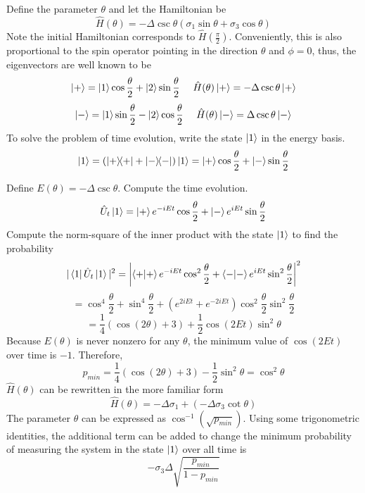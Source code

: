 \begin{sol}
Define the parameter $\theta$ and let the Hamiltonian be 
$$\hat H(\theta)=-\Delta\csc\theta(\sigma_1\sin\theta+\sigma_3\cos\theta)$$
Note the initial Hamiltonian corresponds to $\hat H(\frac{\pi}{2})$. Conveniently, this is also proportional to the spin operator pointing in the direction $\theta$ and $\phi=0$, thus, the eigenvectors are well known to be
$$\ket+= \ket1\cos\frac{\theta}{2}+\ket2\sin\frac{\theta}{2}\:\:\:\:\:\:\hat H(\theta)\ket+=-\Delta\csc\theta\ket+$$ $$\ket-= \ket1\sin\frac{\theta}{2}-\ket2\cos\frac{\theta}{2}\:\:\:\:\:\:\hat H(\theta)\ket-=\Delta\csc\theta\ket-$$ 
To solve the problem of time evolution, write the state $\ket1$ in the energy basis.
$$\ket1=(\ketbra{+}{+}+\ketbra{-}{-})\ket1=\ket+\cos\frac{\theta}{2}+\ket-\sin\frac{\theta}{2}$$

Define $E(\theta)=-\Delta\csc\theta$. Compute the time evolution.
$$\hat U_t\ket1=\ket+e^{-iEt}\cos\frac{\theta}{2}+\ket-e^{iEt}\sin\frac{\theta}{2}$$
Compute the norm-square of the inner product with the state $\ket1$ to find the probability
$$|\bra1\hat U_t\ket1|^2=\left|\braket{+}{+}e^{-iEt}\cos^2\frac{\theta}{2}+\braket{-}{-}e^{iEt}\sin^2\frac{\theta}{2}\right|^2$$ 
$$=\cos^4\frac{\theta}{2}+\sin^4\frac{\theta}{2}+(e^{2iEt}+e^{-2iEt})\cos^2\frac{\theta}{2}\sin^2\frac{\theta}{2}$$ 
$$=\frac{1}{4}(\cos(2\theta)+3)+\frac{1}{2}\cos(2Et)\sin^2\theta$$
Because $E(\theta)$ is never nonzero for any $\theta$, the minimum value of $\cos(2Et)$ over time is $-1$. Therefore,
$$p_{min}=\frac{1}{4}(\cos(2\theta)+3)-\frac{1}{2}\sin^2\theta=\cos^2\theta$$
$\hat H(\theta)$ can be rewritten in the more familiar form
$$\hat H(\theta)=-\Delta\sigma_1+(-\Delta\sigma_3\cot\theta)$$
The parameter $\theta$ can be expressed as $\cos^{-1}(\sqrt{p_{min}})$. Using some trigonometric identities, the additional term can be added to change the minimum probability of measuring the system in the state $\ket1$ over all time is
$$-\sigma_3\Delta\sqrt{\frac{p_{min}}{1-p_{min}}}$$ 

\end{sol}
